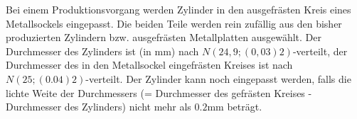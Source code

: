 \documentclass{abgabe}
\begin{document}
\begin{questions}
    \question
    Bei einem Produktionsvorgang werden Zylinder in den ausgefrästen Kreis eines Metallsockels eingepasst. 
    Die beiden Teile werden rein zufällig aus den bisher produzierten Zylindern bzw. ausgefrästen Metallplatten ausgewählt. 
    Der Durchmesser des Zylinders ist (in \si{\mm}) nach $N(24,9; (0,03)2)$-verteilt, der Durchmesser des in den Metallsockel eingefrästen Kreises ist nach $N(25; (0.04)2)$-verteilt. 
    Der Zylinder kann noch eingepasst werden, falls die lichte Weite der Durchmessers (= Durchmesser des gefrästen Kreises - Durchmesser des Zylinders) nicht mehr als $0.2\si{\mm}$ beträgt.
\end{questions}
\end{document}
